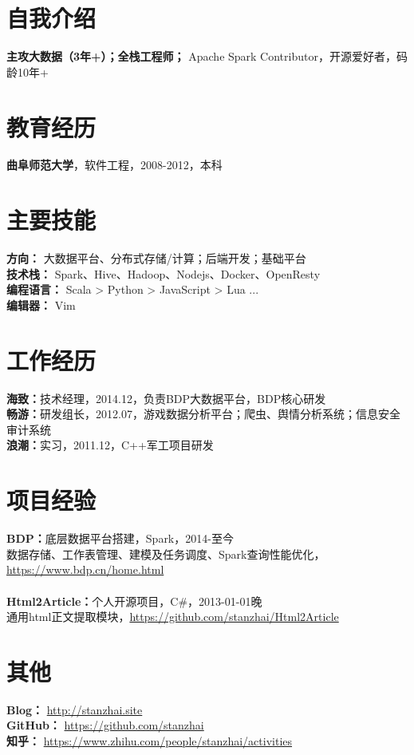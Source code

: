\documentclass[UTF8,margin,line]{res}
\begin{document}

\begin{resume}

\section{\sc 自我介绍}
\textbf{主攻大数据（3年+）；全栈工程师；} Apache Spark Contributor，开源爱好者，码龄10年+

\section{\sc 教育经历}
\textbf{曲阜师范大学}，软件工程，2008-2012，本科

\section{\sc 主要技能}
\textbf{方向：} 大数据平台、分布式存储/计算；后端开发；基础平台 \\
\textbf{技术栈：} Spark、Hive、Hadoop、Nodejs、Docker、OpenResty \\
\textbf{编程语言：} Scala > Python > JavaScript > Lua ... \\
\textbf{编辑器：} Vim

\section{\sc 工作经历}
\textbf{海致：}技术经理，2014.12，负责BDP大数据平台，BDP核心研发 \\
\textbf{畅游：}研发组长，2012.07，游戏数据分析平台；爬虫、舆情分析系统；信息安全审计系统 \\
\textbf{浪潮：}实习，2011.12，C++军工项目研发

\section{\sc 项目经验}
\textbf{BDP：}底层数据平台搭建，Spark，2014-至今 \\
数据存储、工作表管理、建模及任务调度、Spark查询性能优化， \url{https://www.bdp.cn/home.html} \\
\\
\textbf{Html2Article：}个人开源项目，C\#，2013-01-01晚 \\
通用html正文提取模块，\url{https://github.com/stanzhai/Html2Article} \\

\section{\sc 其他}
\textbf{Blog：} \url{http://stanzhai.site} \\
\textbf{GitHub：} \url{https://github.com/stanzhai} \\
\textbf{知乎：} \url{https://www.zhihu.com/people/stanzhai/activities} \\

\end{resume}
\end{document}
